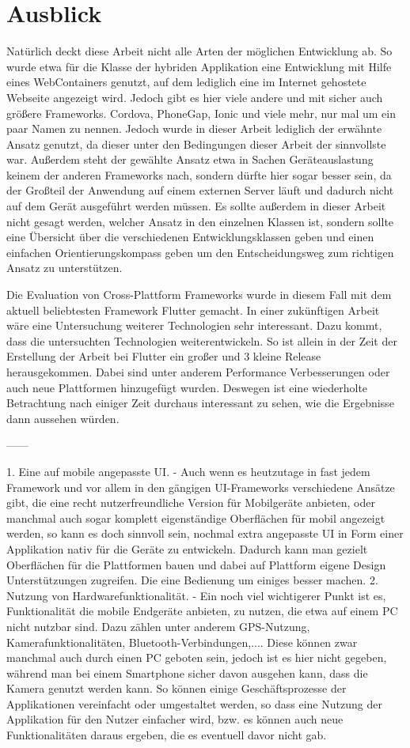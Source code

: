 \section{Ausblick}
Natürlich deckt diese Arbeit nicht alle Arten der möglichen Entwicklung ab. So wurde etwa für die Klasse der hybriden Applikation eine Entwicklung mit Hilfe eines WebContainers genutzt, auf dem lediglich eine im Internet gehostete Webseite angezeigt wird. Jedoch gibt es hier viele andere und mit sicher auch größere Frameworks. Cordova, PhoneGap, Ionic und viele mehr, nur mal um ein paar Namen zu nennen. Jedoch wurde in dieser Arbeit lediglich der erwähnte Ansatz genutzt, da dieser unter den Bedingungen dieser Arbeit der sinnvollste war. Außerdem steht der gewählte Ansatz etwa in Sachen Geräteauslastung keinem der anderen Frameworks nach, sondern dürfte hier sogar besser sein, da der Großteil der Anwendung auf einem externen Server läuft und dadurch nicht auf dem Gerät ausgeführt werden müssen. Es sollte außerdem in dieser Arbeit nicht gesagt werden, welcher Ansatz in den einzelnen Klassen ist, sondern sollte eine Übersicht über die verschiedenen Entwicklungsklassen geben und einen einfachen Orientierungskompass geben um den Entscheidungsweg zum richtigen Ansatz zu unterstützen.

Die Evaluation von Cross-Plattform Frameworks wurde in diesem Fall mit dem aktuell beliebtesten Framework Flutter gemacht. In einer zukünftigen Arbeit wäre eine Untersuchung weiterer Technologien sehr interessant. Dazu kommt, dass die untersuchten Technologien weiterentwickeln. So ist allein in der Zeit der Erstellung der Arbeit bei Flutter ein großer und 3 kleine Release herausgekommen. Dabei sind unter anderem Performance Verbesserungen oder auch neue Plattformen hinzugefügt wurden. Deswegen ist eine wiederholte Betrachtung nach einiger Zeit durchaus interessant zu sehen, wie die Ergebnisse dann aussehen würden.

------

1. Eine auf mobile angepasste UI. - Auch wenn es heutzutage in fast jedem Framework und vor allem in den gängigen UI-Frameworks verschiedene Ansätze gibt, die eine recht nutzerfreundliche Version für Mobilgeräte anbieten, oder manchmal auch sogar komplett eigenständige Oberflächen für mobil angezeigt werden, so kann es doch sinnvoll sein, nochmal extra angepasste UI in Form einer Applikation nativ für die Geräte zu entwickeln. Dadurch kann man gezielt Oberflächen für die Plattformen bauen und dabei auf Plattform eigene Design Unterstützungen zugreifen. Die eine Bedienung um einiges besser machen.
2. Nutzung von Hardwarefunktionalität. -  Ein noch viel wichtigerer Punkt ist es, Funktionalität die mobile Endgeräte anbieten, zu nutzen, die etwa auf einem PC nicht nutzbar sind. Dazu zählen unter anderem GPS-Nutzung, Kamerafunktionalitäten, Bluetooth-Verbindungen,.... Diese können zwar manchmal auch durch einen PC geboten sein, jedoch ist es hier nicht gegeben, während man bei einem Smartphone sicher davon ausgehen kann, dass die Kamera genutzt werden kann. So können einige Geschäftsprozesse der Applikationen vereinfacht oder umgestaltet werden, so dass eine Nutzung der Applikation für den Nutzer einfacher wird, bzw. es können auch neue Funktionalitäten daraus ergeben, die es eventuell davor nicht gab.


